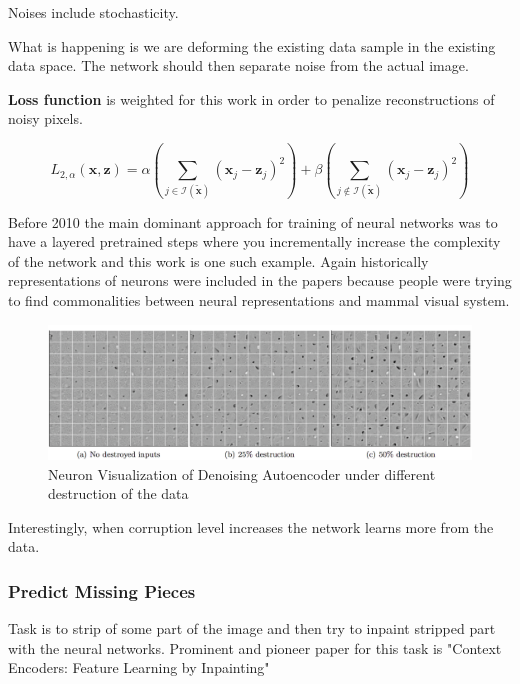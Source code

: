 \documentclass{article}
\begin{document}
Noises include stochasticity.
 
\par
What is happening is we are deforming the existing data sample in the existing data space.
The network should then separate noise from the actual image.
 
\textbf{Loss function} is weighted for this work in order to penalize
reconstructions of noisy pixels.
 
%
\begin{equation}
   L_{2, \alpha}
   (\mathbf{x}, \mathbf{z})
   =\alpha
   \left(\sum_{j \in \mathcal{I}(\tilde{\mathbf{x}})}\left(\mathbf{x}_{j}-\mathbf{z}_{j}\right)^{2}\right)
   +\beta\left(\sum_{j \notin \mathcal{I}(\tilde{\mathbf{x}})}\left(\mathbf{x}_{j}-\mathbf{z}_{j}\right)^{2}\right)
   \label{eq:denoising_autoencoder_loss_function}   
\end{equation}
%
 
 
Before 2010 the main dominant approach for training of neural networks
was to have a layered pretrained steps where you incrementally increase
the complexity of  the network and this work is one such example. Again
historically representations of neurons were included in the papers because
people were trying to find commonalities between neural representations
and mammal visual system.
 
\begin{figure}[H]
   \centering
   \includegraphics[width=0.8\linewidth]{figures/denoising_autoencoder_neuron_visualizition.png}
   \caption{ Neuron Visualization of Denoising Autoencoder under different destruction of the data}
   \end{figure}
 
Interestingly, when corruption level increases the network learns more from
the data.
 
 
\subsubsection{Predict Missing Pieces}
Task is to strip of some part of the image and then try to inpaint
stripped part with the neural networks.
Prominent and pioneer paper for this task is
"Context Encoders: Feature Learning by Inpainting" \cite{pathak2016context}
 
\end{document}
